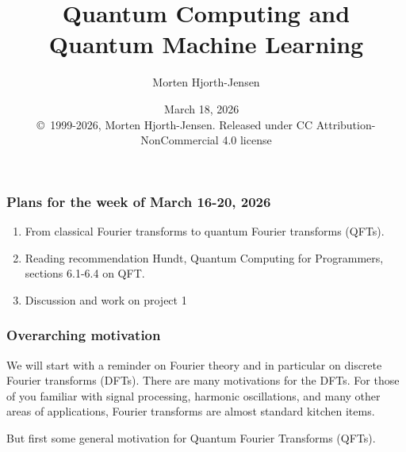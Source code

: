\documentclass{beamer}
\begin{document}

\newcommand{\exercisesection}[1]{\subsection*{#1}}







\title{Quantum Computing and Quantum Machine Learning}


\author{Morten Hjorth-Jensen}

\date{March 18, 2026
\ \\ 
{\tiny \copyright\ 1999-2026, Morten Hjorth-Jensen. Released under CC Attribution-NonCommercial 4.0 license}
}

\begin{frame}
\titlepage
\end{frame}

\begin{frame}
\frametitle{Plans for the week of March 16-20, 2026}

\begin{block}{}
\begin{enumerate}
\item From classical Fourier transforms to quantum Fourier transforms (QFTs).

\item Reading recommendation Hundt, Quantum Computing for Programmers, sections 6.1-6.4 on QFT.

\item Discussion and work on  project 1
\end{enumerate}

\noindent
\end{block}
\end{frame}

\begin{frame}
\frametitle{Overarching motivation}

We will start with a reminder on Fourier theory and in particular on discrete Fourier transforms (DFTs).  There are many
motivations for the DFTs. For those of you familiar with signal
processing, harmonic oscillations, and many other areas of
applications, Fourier transforms are almost standard kitchen
items. 

But first some general motivation for Quantum Fourier Transforms (QFTs).
\end{frame}
\end{document}
